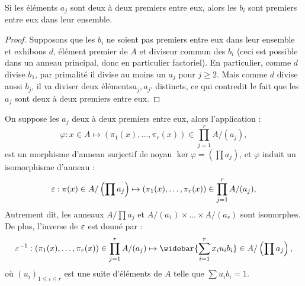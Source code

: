 \begin{lem}
Si les éléments $a_j$ sont deux à deux premiers entre eux, alors les $b_i$ sont premiers entre eux dans leur ensemble.
\end{lem}

\begin{proof}
Supposons que les $b_i$ ne soient pas premiers entre eux dans leur ensemble et exhibons $d$, 
élément premier de $A$ et diviseur commun 
des $b_i$ (ceci est possible dans un anneau principal, donc en particulier factoriel). 
En particulier, comme $d$ divise $b_1$, par primalité il divise au moins un $a_j$ pour $j \geq 2$. 
Mais comme $d$ divise aussi $b_j$, il va diviser deux éléments$a_j, a_{j'}$ distincts, ce qui contredit le fait que les $a_j$ sont 
deux à deux premiers entre eux.
\end{proof}

\begin{thm}
On suppose les $a_j$ deux à deux premiers entre eux, alors l'application :
\[ \varphi : x \in A \mapsto (\pi_1(x), \dots, \pi_r(x)) \in \prod_{j=1}^r A / (a_j) , \]
est un morphisme d'anneau surjectif de noyau $\ker{\varphi} = \left ( \prod a_j \right )$, 
et $\varphi$ induit un isomorphisme d'anneau :
\[ \varepsilon : \pi(x) \in A / \left ( \prod a_j \right ) \mapsto (\pi_1(x), \dots, \pi_r(x)) \in \prod_{j=1}^r A / (a_j) , \]
Autrement dit, les anneaux $A / \prod a_j $ et $A / (a_1) \times \dots \times A / (a_r)$ sont isomorphes.
De plus, l'inverse de $\varepsilon$ est donné par :
\[ \veps^{-1} : (\pi_1(x), \dots, \pi_r(x)) \in \prod_{j=1}^r A / (a_j) \mapsto 
	\widebar{\sum_{i=1}^r x_i u_i b_i } \in A / \left ( \prod a_j \right ), \]
où $(u_i)_{1 \leq i \leq r}$ est une suite d'éléments de $A$ telle que $\sum u_i b_i = 1$.
\end{thm}

